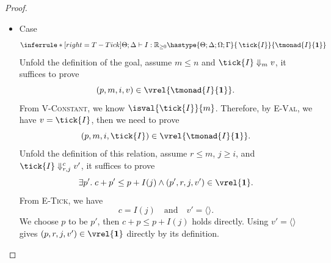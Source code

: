 \begin{proof}
\begin{itemize}
\item Case
\[
  \inferrule*[right=T-Tick]
        {\Theta;\Delta\vdash I:\mathbb{R}_{\ge0}}
        {\hastype{\Theta;\Delta;\Omega;\Gamma}{\,\tick{ I}}{\tmonad{ I}{\textbf{1}}}}
\]
Unfold the definition of the goal, assume $m\leq n$ and
$\tick{I}\Downarrow_m v$, it suffices to prove
\[(p, m, i, v)\in\vrel{\tmonad{I}{\textbf{1}}}.\]
From \textsc{V-Constant}, we know $\isval{\tick{I}}{m}$.
Therefore, by \textsc{E-Val}, we have $v=\tick{I}$, then we need to prove
\[(p, m, i, \tick{I})\in\vrel{\tmonad{I}{\textbf{1}}}.\]
Unfold the definition of this relation, assume $r\leq m$, $j\geq i$, and
$\tick{I}\Downarrow^c_{r,j}v'$, it suffices to prove
\[\exists p'.\;c+p' \leq p+I(j) \land (p', r, j, v')\in\vrel{\textbf{1}}.\]
From \textsc{E-Tick}, we have
\[
  c= I(j)
  \quad\text{and}\quad
  v'=\langle\rangle.
\]
We choose $p$ to be $p'$, then $c+p \leq p+I(j)$ holds directly. Using $v'=\langle\rangle$ gives
$(p, r, j, v')\in\vrel{\textbf{1}}$ directly by its definition.


\end{itemize}
\end{proof}
